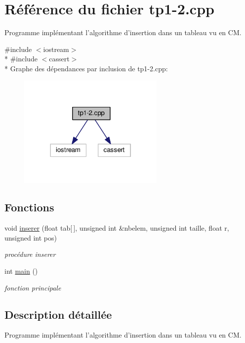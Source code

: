 \hypertarget{tp1-2_8cpp}{\section{Référence du fichier tp1-\/2.cpp}
\label{tp1-2_8cpp}
}


Programme implémentant l'algorithme d'insertion dans un tableau vu en C\+M.  


{\ttfamily \#include $<$iostream$>$}\\*
{\ttfamily \#include $<$cassert$>$}\\*
Graphe des dépendances par inclusion de tp1-\/2.cpp\+:\nopagebreak
\begin{figure}[H]
\begin{center}
\leavevmode
\includegraphics[width=201pt]{tp1-2_8cpp__incl}
\end{center}
\end{figure}
\subsection*{Fonctions}
\begin{DoxyCompactItemize}
\item 
void \hyperlink{tp1-2_8cpp_a293a7e040a686ef8e011c2382f384ebe}{inserer} (float tab\mbox{[}$\,$\mbox{]}, unsigned int \&nbelem, unsigned int taille, float r, unsigned int pos)
\begin{DoxyCompactList}\small\item\em procédure inserer \end{DoxyCompactList}\item 
int \hyperlink{tp1-2_8cpp_ae66f6b31b5ad750f1fe042a706a4e3d4}{main} ()
\begin{DoxyCompactList}\small\item\em fonction principale \end{DoxyCompactList}\end{DoxyCompactItemize}


\subsection{Description détaillée}
Programme implémentant l'algorithme d'insertion dans un tableau vu en C\+M. 

